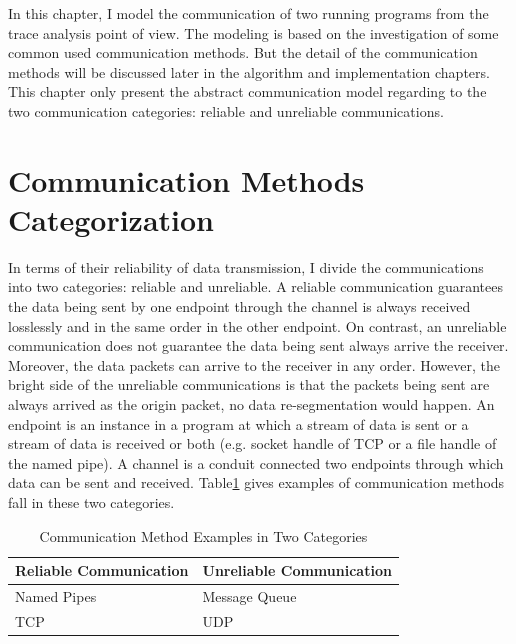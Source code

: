 
\label{chapter:mod}
In this chapter, I model the communication of two running programs from the trace analysis point of view. The modeling is based on the investigation of some common used communication methods. But the detail of the communication methods will be discussed later in the algorithm and implementation chapters. This chapter only present the abstract communication model regarding to the two communication categories: reliable and unreliable communications. 

\section{Communication Methods Categorization}
In terms of their reliability of data transmission, I divide the communications into two categories: reliable and unreliable. A reliable communication guarantees the data being sent by one endpoint through the channel is always received losslessly and in the same order in the other endpoint. On contrast, an unreliable communication does not guarantee the data being sent always arrive the receiver. Moreover, the data packets can arrive to the receiver in any order. However, the bright side of the unreliable communications is that the packets being sent are always arrived as the origin packet, no data re-segmentation would happen. An endpoint is an instance in a program at which a stream of data is sent or a stream of data is received or both (e.g. socket handle of TCP or a file handle of the named pipe). A channel is a conduit connected two endpoints through which data can be sent and received. Table\ref{methodsInCategories} gives examples of communication methods fall in these two categories.
\begin{table}[H]
\centering
\caption{Communication Method Examples in Two Categories}
\label{methodsInCategories}
\begin{tabular}{|l|l|}
 \hline
\textbf{Reliable Communication}& \textbf{Unreliable Communication}\\
 \hline
Named Pipes & Message Queue   \\
TCP &  UDP \\
 \hline
\end{tabular}
\end{table}


